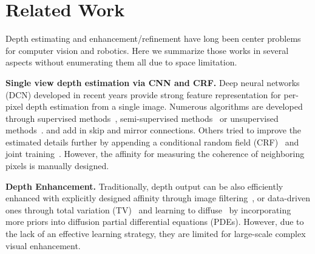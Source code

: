 \section{Related Work}
\label{sec:related}
Depth estimating and enhancement/refinement have long been center problems for computer vision and robotics. Here we summarize those works in several aspects without enumerating them all due to space limitation.

\noindent\textbf{Single view depth estimation via CNN and CRF.}
Deep neural networks (DCN) developed in recent years
provide strong feature representation for 
per-pixel depth estimation from a single image. Numerous algorithms are developed through supervised methods~\cite{wang2015designing,eigen2015predicting,laina2016deeper,li2017two}, semi-supervised methods~\cite{kuznietsov2017semi} or unsupervised methods~\cite{godard2016unsupervised,zhou2017unsupervised,yang2018aaai,yang2018lego}.
and add in skip and mirror connections.
Others tried to improve the estimated details further by appending a conditional random field (CRF)~\cite{DBLP:conf/cvpr/WangSLCPY15,Liu_2015_CVPR,li2015depth} and joint training~\cite{crfasrnn_iccv2015,peng2016depth}. 
However, the affinity for measuring the coherence of neighboring pixels is manually designed.

\noindent\textbf{Depth Enhancement.}
Traditionally, depth output can be also efficiently enhanced with explicitly designed affinity through image filtering~\cite{barron2016fast,matsuo2015depth}, or data-driven ones through total variation (TV)~\cite{ferstl2013image,ferstl2015variational} and learning to diffuse~\cite{liu2016learning} by incorporating more priors into diffusion partial differential equations (PDEs).
However, due to the lack of an effective learning strategy, they are limited for large-scale complex visual enhancement.

